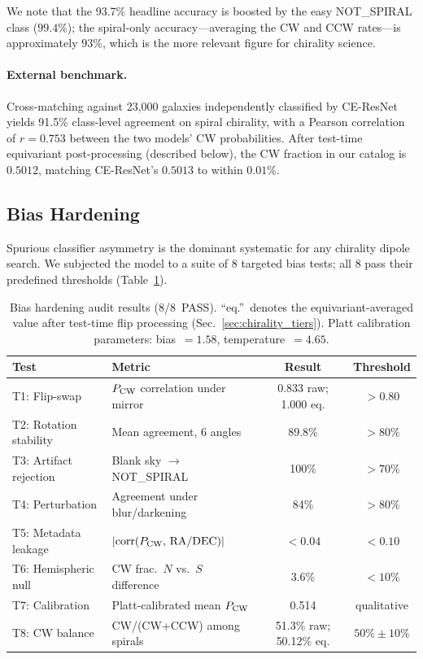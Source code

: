 We note that the 93.7\% headline accuracy is boosted by the easy
NOT\_SPIRAL class ($99.4\%$); the spiral-only accuracy---averaging the
CW and CCW rates---is approximately $93\%$, which is the more relevant
figure for chirality science.

\paragraph{External benchmark.}
Cross-matching against 23{,}000 galaxies independently classified by
CE-ResNet~\citep{Jia:2023} yields 91.5\% class-level agreement on
spiral chirality, with a Pearson correlation of $r = 0.753$ between the
two models' CW probabilities.  After test-time equivariant
post-processing (described below), the CW fraction in our catalog is
$0.5012$, matching CE-ResNet's $0.5013$ to within $0.01\%$.

\subsection{Bias Hardening}
\label{sec:chirality_bias}

Spurious classifier asymmetry is the dominant systematic for any
chirality dipole search.  We subjected the model to a suite of 8
targeted bias tests; all 8 pass their predefined thresholds
(Table~\ref{tab:bias_tests}).

\begin{table}[h]
\centering
\begin{tabular}{llcc}
\toprule
Test & Metric & Result & Threshold \\
\midrule
T1: Flip-swap & $P_{\rm CW}$ correlation under mirror & 0.833 raw; 1.000 eq. & $>0.80$ \\
T2: Rotation stability & Mean agreement, 6 angles & 89.8\% & $>80\%$ \\
T3: Artifact rejection & Blank sky $\to$ NOT\_SPIRAL & 100\% & $>70\%$ \\
T4: Perturbation & Agreement under blur/darkening & 84\% & $>80\%$ \\
T5: Metadata leakage & $|\text{corr}(P_{\rm CW},\,\text{RA/DEC})|$ & $<0.04$ & $<0.10$ \\
T6: Hemispheric null & CW frac.\ $N$ vs.\ $S$ difference & 3.6\% & $<10\%$ \\
T7: Calibration & Platt-calibrated mean $P_{\rm CW}$ & 0.514 & qualitative \\
T8: CW balance & CW/(CW+CCW) among spirals & 51.3\% raw; 50.12\% eq. & $50\% \pm 10\%$ \\
\bottomrule
\end{tabular}
\caption{Bias hardening audit results (8/8~PASS).  ``eq.''\ denotes the
  equivariant-averaged value after test-time flip processing
  (Sec.~\ref{sec:chirality_tiers}).  Platt calibration parameters:
  bias~$= 1.58$, temperature~$= 4.65$.}
\label{tab:bias_tests}
\end{table}

